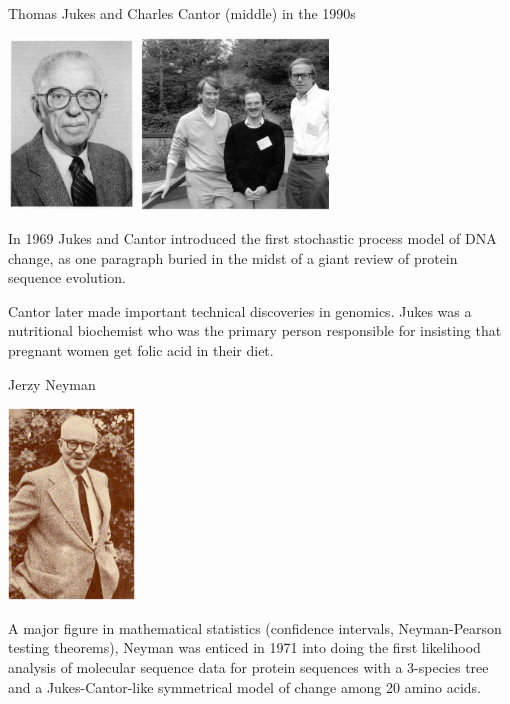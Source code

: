 \documentclass[pdf,bluish,slideColor,colorBG]{prosper}
\begin{document}
\begin{slide}[Replace]{Thomas Jukes and Charles Cantor (middle) in the 1990s}

\begin{center}
\includegraphics[height=1.8in]{jukes.ps} \includegraphics[height=1.8in]{cantor.ps}
\end{center}
\medskip

In 1969 Jukes and Cantor introduced the first stochastic process model
of DNA change, as one paragraph buried in the midst of a giant review of
protein sequence evolution.
\medskip

Cantor later made important technical discoveries in genomics.  Jukes was
a nutritional biochemist who was the primary person responsible for insisting
that pregnant women get folic acid in their diet.

\end{slide}

\begin{slide}[Replace]{Jerzy Neyman}

\centerline{\includegraphics[height=2in]{neyman.ps}}
\medskip

A major figure in mathematical statistics (confidence intervals, Neyman-Pearson
testing theorems), Neyman was enticed in 1971
into doing the first likelihood analysis of molecular sequence data for
protein sequences with a 3-species tree and a Jukes-Cantor-like symmetrical
model of change among 20 amino acids.

\end{slide}
\end{document}
